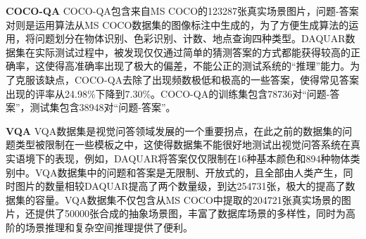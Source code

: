 
\textbf{COCO-QA}\qquad
COCO-QA包含来自MS COCO的123287张真实场景图片，问题-答案对则是运用算法从MS COCO数据集的图像标注中生成的，为了方便生成算法的运用，将问题划分在物体识别、色彩识别、计数、地点查询四种类型。DAQUAR数据集在实际测试过程中，被发现仅仅通过简单的猜测答案的方式都能获得较高的正确率，这使得高准确率出现了极大的偏差，不能公正的测试系统的“推理”能力。为了克服该缺点，COCO-QA去除了出现频数极低和极高的一些答案，使得常见答案出现的评率从24.98\%下降到7.30\%。COCO-QA的训练集包含78736对“问题-答案”，测试集包含38948对“问题-答案”。

\textbf{VQA}\qquad
VQA数据集是视觉问答领域发展的一个重要拐点，在此之前的数据集的问题类型被限制在一些模板之中，这使得数据集不能很好地测试出视觉问答系统在真实语境下的表现，例如，DAQUAR将答案仅仅限制在16种基本颜色和894种物体类别中。VQA数据集中的问题和答案是无限制、开放式的，且全部由人类产生，同时图片的数量相较DAQUAR提高了两个数量级，到达254731张，极大的提高了数据集的容量。VQA数据集不仅包含从MS COCO中提取的204721张真实场景的图片，还提供了50000张合成的抽象场景图，丰富了数据库场景的多样性，同时为高阶的场景推理和复杂空间推理提供了便利。

